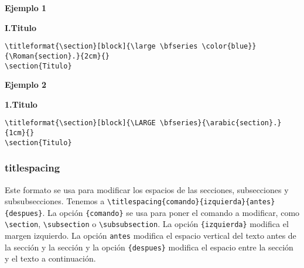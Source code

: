 	\textbf{Ejemplo 1}	
	
	\noindent
	{\large \bfseries{\color{blue}I.\hspace{2cm}Titulo}}
	
	\begin{myquote}
		\begin{lstlisting}
\titleformat{\section}[block]{\large \bfseries \color{blue}}{\Roman{section}.}{2cm}{} 
\section{Titulo}
		\end{lstlisting}
	\end{myquote} 

	\textbf{Ejemplo 2}	
	
	\noindent
	{\LARGE \bfseries{1.\hspace{1cm}Titulo}}
	
	\begin{myquote}
		\begin{lstlisting}
\titleformat{\section}[block]{\LARGE \bfseries}{\arabic{section}.}{1cm}{}
\section{Titulo}
		\end{lstlisting}
	\end{myquote} 

	\subsubsection{titlespacing}
	Este formato se usa para modificar los espacios de las secciones, subsecciones y subsubsecciones. Tenemos a \verb|\titlespacing{comando}{izquierda}{antes}{despues}|. La opción \verb|{comando}| se usa para poner el comando a modificar, como \verb|\section|, \verb|\subsection| o \verb|\subsubsection|. La opción \verb|{izquierda}| modifica el margen izquierdo. La opción \verb|antes| modifica el espacio vertical del texto antes de la sección y la sección y la opción \verb|{despues}| modifica el espacio entre la sección y el texto a continuación.
	

